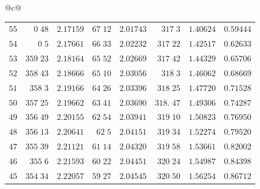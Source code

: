 \begin{center}
{\begin{tabular}{@{}c@{}}
\begin{tabular}{r|r|r|r|r|r|r|r}
$55$&$0\;48$&$2.17159$&$67\;12$&$2.01743$&$317\;3$&$1.40624$&$0.59444$\\
$54$&$0\;5$&$2.17661$&$66\;33$&$2.02232$&$317\;22$&$1.42517$&$0.62633$\\
$53$&$359\;23$&$2.18164$&$65\;52$&$2.02669$&$317\;42$&$1.44329$&$0.65706$\\
$52$&$358\;43$&$2.18666$&$65\;10$&$2.03056$&$318\;3$&$1.46062$&$0.68669$\\
$51$&$358\;3$&$2.19166$&$64\;26$&$2.03396$&$318\;25$&$1.47720$&$0.71528$\\[2pt]
$50$&$357\;25$&$2.19662$&$63\;41$&$2.03690$&$318.\;47$&$1.49306$&$0.74287$\\
$49$&$356\;49$&$2.20155$&$62\;54$&$2.03941$&$319\;10$&$1.50823$&$0.76950$\\
$48$&$356\;13$&$2.20641$&$62\;5$&$2.04151$&$319\;34$&$1.52274$&$0.79520$\\
$47$&$355\;39$&$2.21121$&$61\;14$&$2.04320$&$319\;58$&$1.53661$&$0.82002$\\
$46$&$355\;6$&$2.21593$&$60\;22$&$2.04451$&$320\;24$&$1.54987$&$0.84398$\\[2pt]
$45$&$354\;34$&$2.22057$&$59\;27$&$2.04545$&$320\;50$&$1.56254$&$0.86712$\\
\end{tabular}
\end{tabular}%
}
\end{center}
\endgroup
\clearpage
{}
\begingroup
\fontsize{9}{10.2}\selectfont
\setlength{\tabcolsep}{1.5pt}
\renewcommand{\arraystretch}{1.02}
